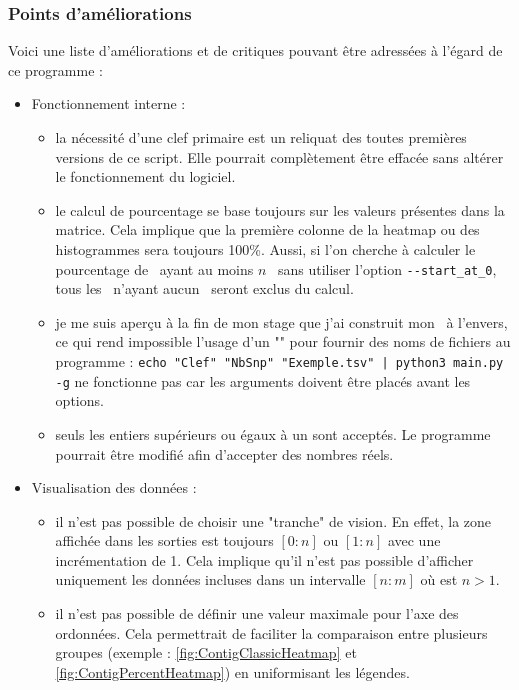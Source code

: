 \documentclass[../main]{subfiles} %
\begin{document}
\subsubsection{Points d'améliorations}
Voici une liste d'améliorations et de critiques pouvant être adressées à l'égard de ce programme :

\begin{itemize}
    \item Fonctionnement interne :
        \begin{itemize}
            \item la nécessité d'une clef primaire est un reliquat des toutes premières versions de ce script. Elle pourrait complètement être effacée sans altérer le fonctionnement du logiciel.   

            \item le calcul de pourcentage se base toujours sur les valeurs présentes dans la matrice. Cela implique que la première colonne de la heatmap ou des histogrammes sera toujours 100\%. Aussi, si l'on cherche à calculer le pourcentage de \contigs ayant au moins $n$ \SNP sans utiliser l'option  \lstinline{--start_at_0}, tous les \contigs n'ayant aucun \SNP seront exclus du calcul.
   
            \item je me suis aperçu à la fin de mon stage que j'ai construit mon \getopts à l'envers, ce qui rend impossible l'usage d'un "\pipe" pour fournir des noms de fichiers au programme : \lstinline{echo "Clef" "NbSnp" "Exemple.tsv" | python3 main.py -g} ne fonctionne pas car les arguments doivent être placés avant les options. 


            \item seuls les entiers supérieurs ou égaux à un sont acceptés. Le programme pourrait être modifié afin d'accepter des nombres réels.
    
        \end{itemize}

    \item Visualisation des données :
        \begin{itemize}
            \item il n'est pas possible de choisir une "tranche" de vision. En effet, la zone affichée dans les sorties est toujours $[0:n]$ ou $[1:n]$ avec une incrémentation de 1. Cela implique qu'il n'est pas possible d'afficher uniquement les données incluses dans un intervalle $[n:m]$ où est $n>1$.
            
            \item il n'est pas possible de définir une valeur maximale pour l'axe des ordonnées. Cela permettrait de faciliter la comparaison entre plusieurs groupes (exemple : \cref{fig:ContigClassicHeatmap} et \cref{fig:ContigPercentHeatmap}) en uniformisant les légendes.  


\end{itemize}
\end{itemize}
\end{document}
